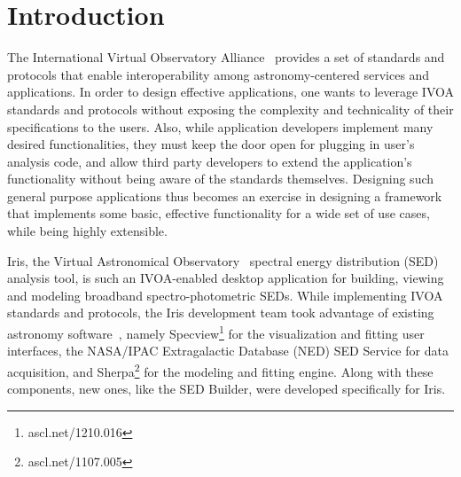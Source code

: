 \documentclass[final,5p,authoryear]{elsarticle}
\begin{document}
\label{sec:introduction} \section{Introduction} The International Virtual
Observatory Alliance~\citep[IVOA;][]{2004SPIE.5493..137Q} provides a set of
standards and protocols that enable interoperability among astronomy-centered
services and applications. In order to design effective applications, one wants
to leverage IVOA standards and protocols without exposing the complexity and
technicality of their specifications to the users. Also, while application
developers implement many desired functionalities, they must keep the door open
for plugging in user's analysis code, and allow third party developers to extend
the application's functionality without being aware of the standards themselves.
Designing such general purpose applications thus becomes an exercise in
designing a framework that implements some basic, effective functionality for a
wide set of use cases, while being highly extensible.


Iris, the Virtual Astronomical Observatory~\citep[VAO;][]{2012SPIE.8449E..0HB}
spectral energy distribution (SED) analysis tool, is such an IVOA-enabled
desktop application for building, viewing and modeling broadband
spectro-photometric SEDs. While implementing IVOA standards and protocols, the
Iris development team took advantage of existing astronomy
software~\citep{2012ASPC..461..893D,2013AAS...22124038L}, namely
Specview\footnote{ascl.net/1210.016} for the visualization and fitting user
interfaces, the NASA/IPAC Extragalactic Database (NED) SED Service for data
acquisition, and Sherpa\footnote{ascl.net/1107.005} for the modeling and fitting
engine. Along with these components, new ones, like the SED Builder, were
developed specifically for Iris. 

\end{document}
